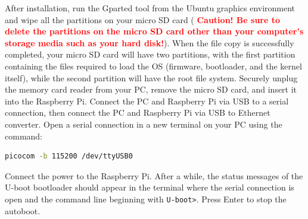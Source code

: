\documentclass[11pt]{article}
\begin{document}
After installation, run the Gparted tool from the Ubuntu graphics environment
 and wipe all the partitions on your micro SD card (
 \textbf{\textcolor{red}{Caution! Be sure to delete the partitions on the micro
 SD card other than your computer's storage media such as your hard disk!}}).
\newline
\newline
When the file copy is successfully completed, your micro SD card will have
 two partitions, with the first partition containing the files required to load
 the OS (firmware, bootloader, and the kernel itself), while the second
 partition will have the root file system. Securely unplug the memory card
 reader from your PC, remove the micro SD card, and insert it into the
 Raspberry Pi. Connect the PC and Raspberry Pi via USB to a serial connection,
 then connect the PC and Raspberry Pi via USB to Ethernet converter.
Open a serial connection in a new terminal on your PC using the command:
\begin{lstlisting}[language=bash]
picocom -b 115200 /dev/ttyUSB0
\end{lstlisting}
Connect the power to the Raspberry Pi. After a while, the status messages of
 the U-boot bootloader should appear in the terminal where the serial
 connection is open and the command line beginning with \texttt{U-boot>}. Press
 Enter to stop the autoboot.
\end{document}
